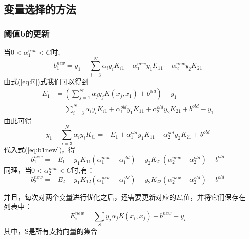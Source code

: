\documentclass{article}
\begin{document}
\subsection{变量选择的方法}
\subsubsection{阈值b的更新}
当$0<\alpha_1^{new}<C$时,
\begin{equation}
    b_1^{new}=y_1-\sum_{i=3}^{N}\alpha_i y_i K_{i1}-\alpha_1^{new} y_1 K_{11}-\alpha_2^{new} y_2 K_{21}\label{eq:b1new}
\end{equation}
由式(\ref{eq:E})式我们可以得到
\begin{align}
    E_1&=(\sum_{j=1}^{N}\alpha_j y_j K(x_j,x_1)+b^{old})-y_1\\
    &=\sum_{i=3}^{N}\alpha_i y_i K_{i1}+\alpha_1^{old} y_1 K_{11}+\alpha_2^{old} y_2 K_{21}+b^{old}-y_1
\end{align}
由此可得
\begin{equation}
    y_1-\sum_{i=3}^{N}\alpha_i y_i K_{i1}=-E_1+\alpha_1^{old} y_1 K_{11} +\alpha_2^{old} y_2 K_{21} +b^{old}
\end{equation}
代入式(\ref{eq:b1new})，得
\begin{equation}
    b_1^{new}=-E_1-y_1 K_{11}(\alpha_1^{new}-\alpha_1^{old})-y_2 K_{21}(\alpha_2^{new}-\alpha_2^{old})+b^{old}
\end{equation}
同理，当$0<\alpha_2^{new}<C$时,有：
\begin{equation}
    b_2^{new}=-E_2-y_1 K_{12}(\alpha_1^{new}-\alpha_1^{old})-y_2 K_{22}(\alpha_2^{new}-\alpha_2^{old})+b^{old}
\end{equation}

并且，每次对两个变量进行优化之后，还需要更新对应的$E_i$值，并将它们保存在列表中：
\begin{equation}
    E_i^{new}=\sum_{S} y_j \alpha_j K(x_i,x_j)+b^{new}-y_i
\end{equation}
其中，S是所有支持向量的集合
\end{document}
